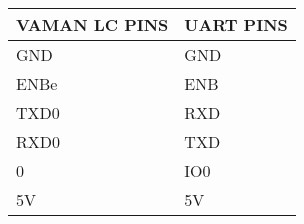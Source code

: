 \begin{tabular}{|p{4cm}|p{4cm}|}    
\hline              
\textbf{VAMAN LC PINS} & \textbf{UART PINS}\\                                  
\hline                     
GND & GND \\                 
\hline                        
ENBe & ENB \\         
\hline                
TXD0 & RXD \\              
\hline            
RXD0 & TXD\\   
\hline                                  
0 & IO0 \\                  
\hline                               
5V & 5V\\         
\hline                    
\end{tabular}
